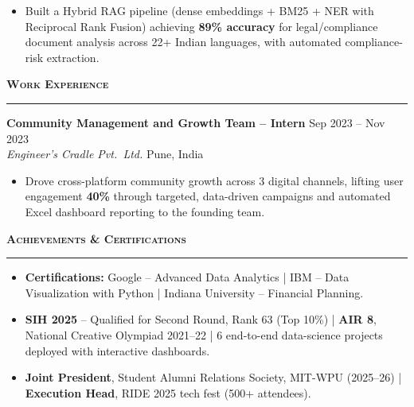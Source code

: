 \documentclass[a4paper,10pt]{article}
\newcommand{\sectionHeader}[2]{%
  \vspace{4pt}%
  \noindent%
  {\normalsize\bfseries\color{HeaderDark}#2\enspace\textsc{#1}}%
  \\[-6pt]%
  {\color{SectionLine}\rule{\textwidth}{1pt}}%
  \vspace{1pt}\par%
}
\newcommand{\expEntry}[4]{%
  \vspace{1pt}%
  \noindent\textbf{\color{HeaderDark}#1} \hfill {\small\color{SubText}#2}\\[-3pt]%
  {\small\color{MidGray}\textit{#3}} \hfill {\small\color{SubText}#4}%
  \vspace{0pt}\par%
}
\begin{document}
\begin{itemize}[leftmargin=14pt, itemsep=0pt, parsep=0pt, topsep=1pt, label={\color{BulletColor}\textbf{--}}]
  \item {\small Built a Hybrid RAG pipeline (dense embeddings + BM25 + NER with Reciprocal Rank Fusion) achieving \textbf{89\% accuracy} for legal/compliance document analysis across 22+ Indian languages, with automated compliance-risk extraction.}
\end{itemize}


\sectionHeader{Work Experience}{\faLaptopCode}

\expEntry{Community Management and Growth Team -- Intern}
  {Sep 2023 -- Nov 2023}
  {Engineer's Cradle Pvt.\ Ltd.}
  {Pune, India}

\begin{itemize}[leftmargin=14pt, itemsep=0pt, parsep=0pt, topsep=1pt, label={\color{BulletColor}\textbf{--}}]
  \item {\small Drove cross-platform community growth across 3 digital channels, lifting user engagement \textbf{40\%} through targeted, data-driven campaigns and automated Excel dashboard reporting to the founding team.}
\end{itemize}


\sectionHeader{Achievements \& Certifications}{\faTrophy}

\begin{itemize}[leftmargin=14pt, itemsep=0pt, parsep=0pt, topsep=1pt, label={\color{BulletColor}$\bullet$}]
  \item {\small \textbf{Certifications:} Google -- Advanced Data Analytics {\color{SubText}|} IBM -- Data Visualization with Python {\color{SubText}|} Indiana University -- Financial Planning.}
  \item {\small \textbf{SIH 2025} -- Qualified for Second Round, Rank 63 (Top 10\%) {\color{SubText}|} \textbf{AIR 8}, National Creative Olympiad 2021--22 {\color{SubText}|} 6 end-to-end data-science projects deployed with interactive dashboards.}
  \item {\small \textbf{Joint President}, Student Alumni Relations Society, MIT-WPU (2025--26) {\color{SubText}|} \textbf{Execution Head}, RIDE 2025 tech fest (500+ attendees).}
\end{itemize}

\end{document}
